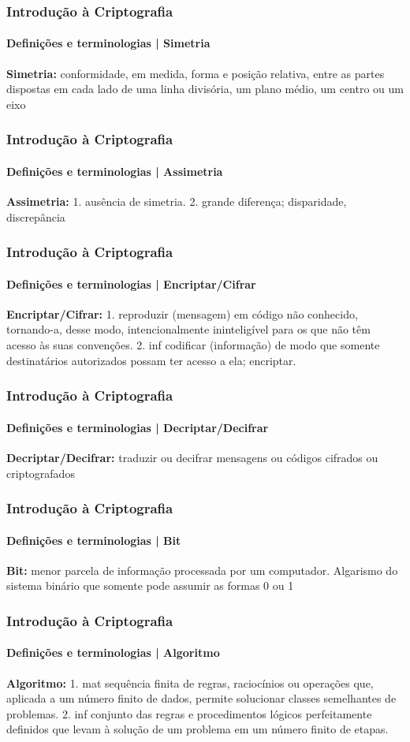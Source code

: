 \documentclass[compress]{beamer}
\begin{document}
\begin{frame}
\frametitle{Introdução à Criptografia}
\framesubtitle{Definições e terminologias | Simetria}
\justifying
	\textbf{Simetria:} conformidade, em medida, forma e posição relativa, entre as partes dispostas em cada lado de uma linha divisória, um plano médio, um centro ou um eixo
\end{frame}

\begin{frame}
\frametitle{Introdução à Criptografia}
\framesubtitle{Definições e terminologias | Assimetria}
\justifying
	\textbf{Assimetria:} 1. ausência de simetria. 2. grande diferença; disparidade, discrepância
\end{frame}

\begin{frame}
\frametitle{Introdução à Criptografia}
\framesubtitle{Definições e terminologias | Encriptar/Cifrar}
\justifying
	\textbf{Encriptar/Cifrar:} 1. reproduzir (mensagem) em código não conhecido, tornando-a, desse modo, intencionalmente ininteligível para os que não têm acesso às suas convenções. 2. inf codificar (informação) de modo que somente destinatários autorizados possam ter acesso a ela; encriptar.
\end{frame}

\begin{frame}
\frametitle{Introdução à Criptografia}
\framesubtitle{Definições e terminologias | Decriptar/Decifrar}
\justifying
	\textbf{Decriptar/Decifrar:} traduzir ou decifrar mensagens ou códigos cifrados ou criptografados
\end{frame}

\begin{frame}
\frametitle{Introdução à Criptografia}
\framesubtitle{Definições e terminologias | Bit}
\justifying
	\textbf{Bit:} menor parcela de informação processada por um computador. Algarismo do sistema binário que somente pode assumir as formas 0 ou 1
\end{frame}

\begin{frame}
\frametitle{Introdução à Criptografia}
\framesubtitle{Definições e terminologias | Algoritmo}
\justifying
	\textbf{Algoritmo:} 1. mat sequência finita de regras, raciocínios ou operações que, aplicada a um número finito de dados, permite solucionar classes semelhantes de problemas. 2. inf conjunto das regras e procedimentos lógicos perfeitamente definidos que levam à solução de um problema em um número finito de etapas.
\end{frame}
\end{document}
